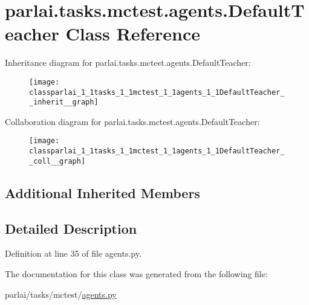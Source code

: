 \hypertarget{classparlai_1_1tasks_1_1mctest_1_1agents_1_1DefaultTeacher}{}\section{parlai.\+tasks.\+mctest.\+agents.\+Default\+Teacher Class Reference}
\label{classparlai_1_1tasks_1_1mctest_1_1agents_1_1DefaultTeacher}


Inheritance diagram for parlai.\+tasks.\+mctest.\+agents.\+Default\+Teacher\+:
\nopagebreak
\begin{figure}[H]
\begin{center}
\leavevmode
\texttt{[image: classparlai\_1\_1tasks\_1\_1mctest\_1\_1agents\_1\_1DefaultTeacher\_\_inherit\_\_graph]}
\end{center}
\end{figure}


Collaboration diagram for parlai.\+tasks.\+mctest.\+agents.\+Default\+Teacher\+:
\nopagebreak
\begin{figure}[H]
\begin{center}
\leavevmode
\texttt{[image: classparlai\_1\_1tasks\_1\_1mctest\_1\_1agents\_1\_1DefaultTeacher\_\_coll\_\_graph]}
\end{center}
\end{figure}
\subsection*{Additional Inherited Members}


\subsection{Detailed Description}


Definition at line 35 of file agents.\+py.



The documentation for this class was generated from the following file\+:\begin{DoxyCompactItemize}
\item 
parlai/tasks/mctest/\hyperlink{parlai_2tasks_2mctest_2agents_8py}{agents.\+py}\end{DoxyCompactItemize}
